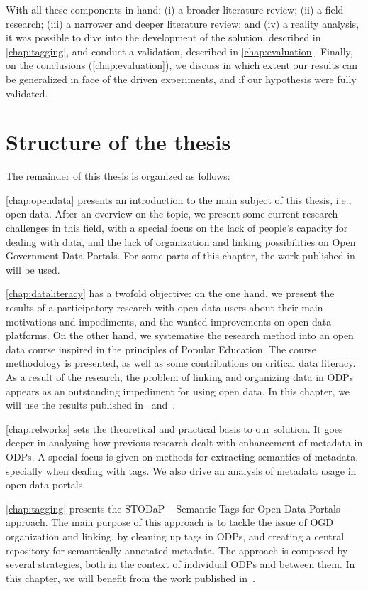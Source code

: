 {With all these components in hand: (i) a broader literature review; (ii) a field research; (iii) a narrower and deeper literature review; and (iv) a reality analysis, it was possible to dive into the development of the solution, described in \autoref{chap:tagging}, and conduct a validation, described in \autoref{chap:evaluation}.
Finally, on the conclusions (\autoref{chap:evaluation}), we discuss in which extent our results can be generalized in face of the driven experiments, and if our hypothesis were fully validated.

\section{Structure of the thesis}

The remainder of this thesis is organized as follows:

\autoref{chap:opendata} presents an introduction to the main subject of this thesis, i.e., open data.
After an overview on the topic, we present some current research challenges in this field, with a special focus on the lack of people's capacity for dealing with data, and the lack of organization and linking possibilities on Open Government Data Portals. 
For some parts of this chapter, the work published in~ will be used.

\autoref{chap:dataliteracy} has a twofold objective: on the one hand, we present the results of a participatory research with open data users about their main motivations and impediments, and the wanted improvements on open data platforms. 
On the other hand, we systematise the research method into an open data course inspired in the principles of Popular Education.
The course methodology is presented, as well as some contributions on critical data literacy.
As a result of the research, the problem of linking and organizing data in ODPs appears as an outstanding impediment for using open data.
In this chapter, we will use the results published in~ and~.

\autoref{chap:relworks} sets the theoretical and practical basis to our solution.
It goes deeper in analysing how previous research dealt with enhancement of metadata in ODPs.
A special focus is given on methods for extracting semantics of metadata, specially when dealing with tags.
We also drive an analysis of metadata usage in open data portals.

\autoref{chap:tagging} presents the STODaP -- Semantic Tags for Open Data Portals -- approach.
The main purpose of this approach is to tackle the issue of OGD organization and linking, by cleaning up tags in ODPs, and creating a central repository for semantically annotated metadata.
The approach is composed by several strategies, both in the context of individual ODPs and between them.
In this chapter, we will benefit from the work published in~.

}
